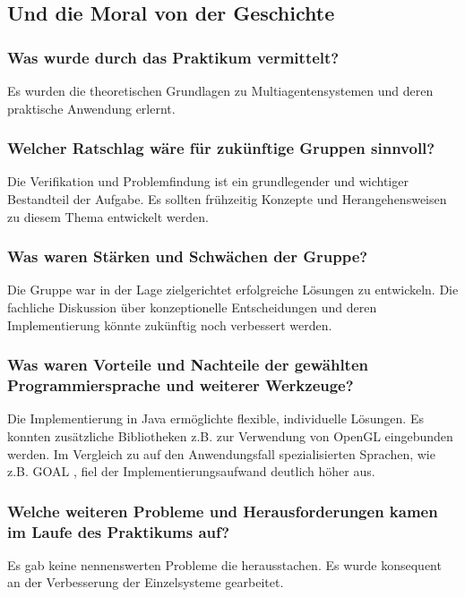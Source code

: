 \documentclass[runningheads]{llncs}
\begin{document}
\subsection{Und die Moral von der Geschichte}
\subsubsection{Was wurde durch das Praktikum vermittelt?\\}
Es wurden die theoretischen Grundlagen zu Multiagentensystemen und deren praktische Anwendung erlernt.
\subsubsection{Welcher Ratschlag wäre für zukünftige Gruppen sinnvoll?\\}
Die Verifikation und Problemfindung ist ein grundlegender und wichtiger Bestandteil der Aufgabe. Es sollten frühzeitig Konzepte und Herangehensweisen zu diesem Thema entwickelt werden.

\subsubsection{Was waren Stärken und Schwächen der Gruppe?\\}
Die Gruppe war in der Lage zielgerichtet erfolgreiche Lösungen zu entwickeln. Die fachliche Diskussion über konzeptionelle Entscheidungen und deren Implementierung könnte zukünftig noch verbessert werden.   

\subsubsection{Was waren Vorteile und Nachteile der gewählten Programmiersprache und weiterer Werkzeuge?\\}
Die Implementierung in Java ermöglichte flexible, individuelle Lösungen. Es konnten zusätzliche Bibliotheken z.B. zur Verwendung von OpenGL eingebunden werden. Im Vergleich zu auf den Anwendungsfall spezialisierten Sprachen, wie z.B. GOAL \cite{Goal}, fiel der Implementierungsaufwand deutlich höher aus.

\subsubsection{Welche weiteren Probleme und Herausforderungen kamen im Laufe des Praktikums auf?\\}
Es gab keine nennenswerten Probleme die herausstachen. Es wurde konsequent an der Verbesserung der Einzelsysteme gearbeitet. 
\end{document}
